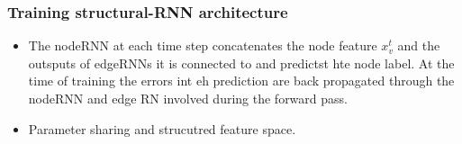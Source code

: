 \documentclass{article}
\begin{document}
\subsubsection{Training structural-RNN architecture}
\begin{itemize}
\item The nodeRNN at each time step concatenates the node feature $x_v^t$ and the outsputs of edgeRNNs it is connected to and predictst hte node label. At the time of training the errors int eh prediction are back propagated through the nodeRNN and edge RN involved during the forward pass.
\item Parameter sharing and strucutred feature space.
\end{itemize}







\end{document}

